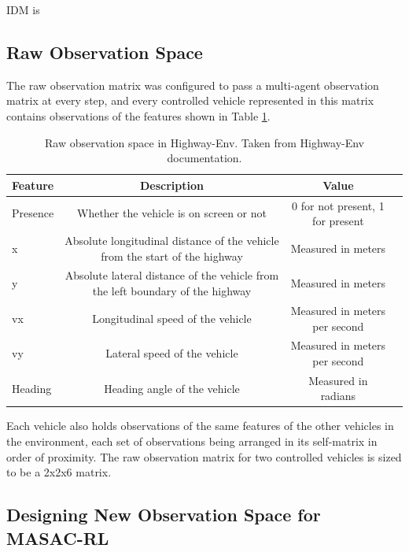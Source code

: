\documentclass[12pt, a4paper]{report}
\begin{document}
IDM is 

\subsection{Raw Observation Space}

The raw observation matrix was configured to pass a multi-agent observation matrix at every step, and every controlled vehicle represented in this matrix contains observations of the features shown in Table \ref{tab:raw_feature_space}.
\begin{table}[htbp]
    \centering
    \caption{Raw observation space in Highway-Env. Taken from Highway-Env documentation. \cite{highway-env}}
    \label{tab:raw_feature_space}
    \renewcommand{\arraystretch}{1.2} %
    \begin{tabular}{lccc}
        \toprule
        \textbf{Feature} & \textbf{Description} & \textbf{Value} \\
        \midrule
        Presence    &  Whether the vehicle is on screen or not & 0 for not present, 1 for present \\
        x           &  Absolute longitudinal distance of the vehicle from the start of the highway & Measured in meters \\
        y           &  Absolute lateral distance of the vehicle from the left boundary of the highway & Measured in meters \\
        vx          &  Longitudinal speed of the vehicle & Measured in meters per second \\
        vy          &  Lateral speed of the vehicle & Measured in meters per second \\
        Heading     &  Heading angle of the vehicle & Measured in radians \\
        \bottomrule
    \end{tabular}
\end{table}

Each vehicle also holds observations of the same features of the other vehicles in the environment, each set of observations being arranged in its self-matrix in order of proximity. The raw observation matrix for two controlled vehicles is sized to be a 2x2x6 matrix.

\subsection{Designing New Observation Space for MASAC-RL}
\end{document}
